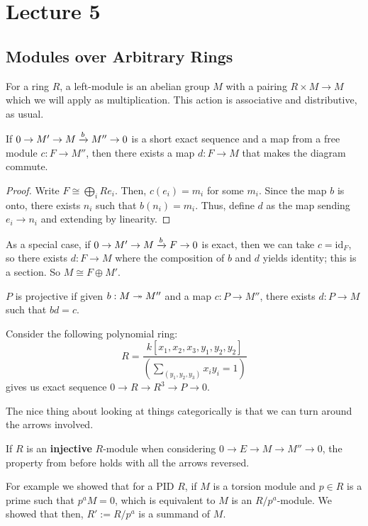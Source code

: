 \section{Lecture 5}
\subsection{Modules over Arbitrary Rings}
For a ring $R$, a left-module is an abelian group $M$ with a pairing $R \times M \to M$
which we will apply as multiplication.
This action is associative and distributive, as usual.
\begin{theorem}
    If $0 \to M' \to M \xrightarrow{b} M'' \to 0$ is a short exact sequence and a map from a free module $c: F \to M''$,
    then there exists a map $d : F \to M$ that makes the diagram commute.
    \begin{proof}
        Write $F \cong \bigoplus_i Re_i$. Then, $c(e_i) = m_i$ for some $m_i$.
        Since the map $b$ is onto, there exists $n_i$ such that $b(n_i) = m_i$. Thus,
        define $d$ as the map sending $e_i \to n_i$ and extending by linearity.
    \end{proof}
\end{theorem}
As a special case, if $0 \to M' \to M \xrightarrow{b} F \to 0$ is exact, then we can take $c = \text{id}_F$,
so there exists $d: F \to M$ where the composition of $b$ and $d$ yields identity; this is a section.
So $M \cong F \oplus M'$.

\begin{definition}
    $P$ is projective if given $b: M \twoheadrightarrow M''$
    and a map $c: P \to M''$,
    there exists $d: P \to M$ such that $bd = c$.
\end{definition}

\begin{example}
    Consider the following polynomial ring:
    \[ R = \frac{k[x_1, x_2, x_3, y_1, y_2, y_2]}{(\sum_{(y_1, y_2, y_3)} x_i y_i = 1)} \]
    gives us exact sequence $0 \to R \to R^3 \to P \to 0$.
\end{example}

The nice thing about looking at things categorically is that we can turn around the arrows involved.
    
If $R$ is an \textbf{injective} $R$-module when considering $0 \to E \to M \to M'' \to 0$,
the property from before holds with all the arrows reversed.

For example we showed that for a PID $R$,
if $M$ is a torsion module and $p \in R$ is a prime
such that $p^a M = 0$, which is equivalent to $M$ is an $R/p^a$-module.
We showed that then, $R' := R/p^a$ is a summand of $M$.

